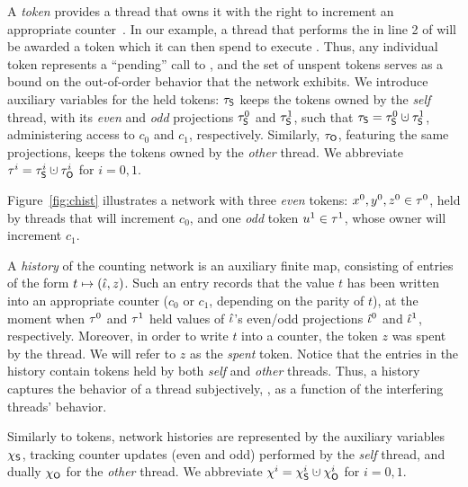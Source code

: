 A \emph{token} provides a thread that owns it with the right to
increment an appropriate counter~\cite{Aspnes-al:JACM94}. In our
example, a thread that performs the  in line 2 of
 will be awarded a token which it can then spend to
execute .
%
Thus, any individual token represents a ``pending'' call to
, and the set of unspent tokens serves as a bound on
the out-of-order behavior that the network exhibits. We introduce
auxiliary variables for the held tokens: $\tau_{\mathsf{S}}$ keeps the tokens
owned by the \emph{self} thread, with its \emph{even} and \emph{odd}
projections $\tau_{\mathsf{S}}^0$ and $\tau_{\mathsf{S}}^1$, such that $\tkns = \tkns^0
\hunion \tkns^1$, administering access to $c_0$ and $c_1$,
respectively. Similarly, $\tau_{\mathsf{O}}$, featuring the same projections,
keeps the tokens owned by the \emph{other} thread.  We abbreviate
$\tkn^i = \tkns^i \hunion \tkno^i$ for $i=0,1$.  
%
%

Figure~\ref{fig:chist} illustrates a network with three \emph{even}
tokens: $x^0, y^0, z^0 \in \tau^0$, held by threads that will
increment $c_0$, and one \emph{odd} token $u^1 \in \tau^1$, whose
owner will increment $c_1$.
%

A \emph{history} of the counting network is an auxiliary finite map,
consisting of entries of the form $t \mapsto (\hat{\iota}, z)$.  Such an
entry records that the value $t$ has been written into an appropriate
counter ($c_0$ or $c_1$, depending on the parity of $t$), at the
moment when $\tau^0$ and $\tau^1$ held values of $\hat{\iota}$'s even/odd
projections $\hat{\iota}^0$ and $\hat{\iota}^1$, respectively. Moreover, in order
to write $t$ into a counter, the token $z$ was spent by the thread. We
will refer to $z$ as the \emph{spent} token. Notice that the entries
in the history contain tokens held by both \emph{self} and
\emph{other} threads. Thus, a history captures the behavior of a
thread subjectively, \ie, as a function of the interfering threads'
behavior.

Similarly to tokens, network histories are represented by the
auxiliary variables $\chi_{\mathsf{S}}$, tracking counter updates (even and odd)
performed by the \emph{self} thread, and dually $\chi_{\mathsf{O}}$ for the
\emph{other} thread. We abbreviate $\hist^i = \hists^i \hunion
\histo^i$ for $i = 0,1$.


